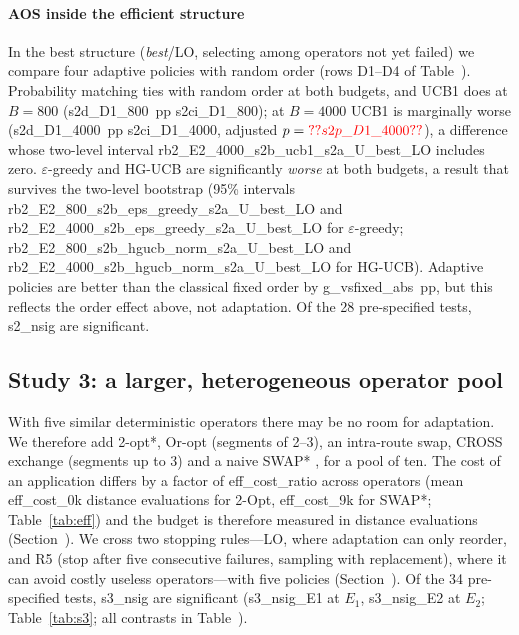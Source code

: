 \paragraph{AOS inside the efficient structure}
In the best structure (\textit{best}/LO, selecting among operators not yet failed) we compare four adaptive policies with random order (rows D1--D4 of Table~). Probability matching ties with random order at both budgets, and UCB1 does at $B=800$ (\num{s2d_D1_800}~pp \num{s2ci_D1_800}); at $B=4000$ UCB1 is marginally worse (\num{s2d_D1_4000}~pp \num{s2ci_D1_4000}, adjusted $p=\num{s2p_D1_4000}$), a difference whose two-level interval \num{rb2_E2_4000_s2b_ucb1_s2a_U_best_LO} includes zero. $\varepsilon$-greedy and HG-UCB are significantly \emph{worse} at both budgets, a result that survives the two-level bootstrap (95\% intervals \num{rb2_E2_800_s2b_eps_greedy_s2a_U_best_LO} and \num{rb2_E2_4000_s2b_eps_greedy_s2a_U_best_LO} for $\varepsilon$-greedy; \num{rb2_E2_800_s2b_hgucb_norm_s2a_U_best_LO} and \num{rb2_E2_4000_s2b_hgucb_norm_s2a_U_best_LO} for HG-UCB). Adaptive policies are better than the classical fixed order by \num{g_vsfixed_abs}~pp, but this reflects the order effect above, not adaptation. Of the 28 pre-specified tests, \num{s2_nsig} are significant.

\subsection{Study 3: a larger, heterogeneous operator pool}\label{sec:s3}
With five similar deterministic operators there may be no room for adaptation. We therefore add 2-opt*, Or-opt (segments of 2--3), an intra-route swap, CROSS exchange (segments up to 3) and a naive SWAP* \citep{vidal2022}, for a pool of ten. The cost of an application differs by a factor of \num{eff_cost_ratio} across operators (mean \num{eff_cost_0}k distance evaluations for 2-Opt, \num{eff_cost_9}k for SWAP*; Table~\ref{tab:eff}) and the budget is therefore measured in distance evaluations (Section~). We cross two stopping rules---LO, where adaptation can only reorder, and R5 (stop after five consecutive failures, sampling with replacement), where it can avoid costly useless operators---with five policies (Section~). Of the 34 pre-specified tests, \num{s3_nsig} are significant (\num{s3_nsig_E1} at $E_1$, \num{s3_nsig_E2} at $E_2$; Table~\ref{tab:s3}; all contrasts in Table~).



